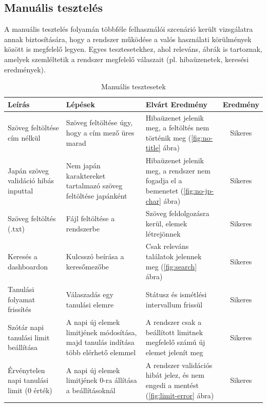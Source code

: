 \subsection{Manuális tesztelés}

A manuális tesztelés folyamán többféle felhasználói szcenárió került vizsgálatra annak biztosítására, hogy a rendszer működése a valós használati körülmények között is megfelelő legyen. Egyes tesztesetekhez, ahol releváns, ábrák is tartoznak, amelyek szemléltetik a rendszer megfelelő válaszait (pl. hibaüzenetek, keresési eredmények).

\begin{table}[H]
	\centering
	\begin{tabular}{|p{3cm}|p{4cm}|p{4cm}|c|}
		\hline
		\textbf{Leírás} & \textbf{Lépések} & \textbf{Elvárt Eredmény} & \textbf{Eredmény} \\
		\hline \hline
		Szöveg feltöltése cím nélkül & Szöveg feltöltése úgy, hogy a cím mező üres marad & Hibaüzenet jelenik meg, a feltöltés nem történik meg (\ref{fig:no-title} ábra) & Sikeres \\
		\hline
		Japán szöveg validáció hibás inputtal & Nem japán karaktereket tartalmazó szöveg feltöltése japánként & Hibaüzenet jelenik meg, a rendszer nem fogadja el a bemenetet (\ref{fig:no-jp-char} ábra) & Sikeres \\
        \hline
        Szöveg feltöltés (.txt) & Fájl feltöltése a rendszerbe & Szöveg feldolgozásra kerül, elemek létrejönnek & Sikeres \\
        \hline
        Keresés a dashboardon & Kulcsszó beírása a keresőmezőbe & Csak releváns találatok jelennek meg (\ref{fig:search} ábra) & Sikeres \\
        \hline
        Tanulási folyamat frissítés & Válaszadás egy tanulási elemre & Státusz és ismétlési intervallum frissül & Sikeres \\
        \hline
        Szótár napi tanulási limit beállítása & A napi új elemek limitjének módosítása, majd tanulás indítása több elérhető elemmel & A rendszer csak a beállított limitnek megfelelő számú új elemet jelenít meg & Sikeres \\
        \hline
        Érvénytelen napi tanulási limit (0 érték) & A napi új elemek limitjének 0-ra állítása a beállításoknál & A rendszer validációs hibát jelez, és nem engedi a mentést (\ref{fig:limit-error} ábra) & Sikeres \\
        \hline
        
	\end{tabular}
	\caption{Manuális tesztesetek}
	\label{tab:management}
\end{table}

